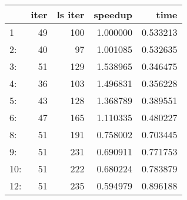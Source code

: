 \begin{tabular}{lrrrr}
\toprule
{} &  iter &  ls iter &   speedup &      time \\
\midrule
1   &    49 &      100 &  1.000000 &  0.533213 \\
2:  &    40 &       97 &  1.001085 &  0.532635 \\
3:  &    51 &      129 &  1.538965 &  0.346475 \\
4:  &    36 &      103 &  1.496831 &  0.356228 \\
5:  &    43 &      128 &  1.368789 &  0.389551 \\
6:  &    47 &      165 &  1.110335 &  0.480227 \\
8:  &    51 &      191 &  0.758002 &  0.703445 \\
9:  &    51 &      231 &  0.690911 &  0.771753 \\
10: &    51 &      222 &  0.680224 &  0.783879 \\
12: &    51 &      235 &  0.594979 &  0.896188 \\
\bottomrule
\end{tabular}

